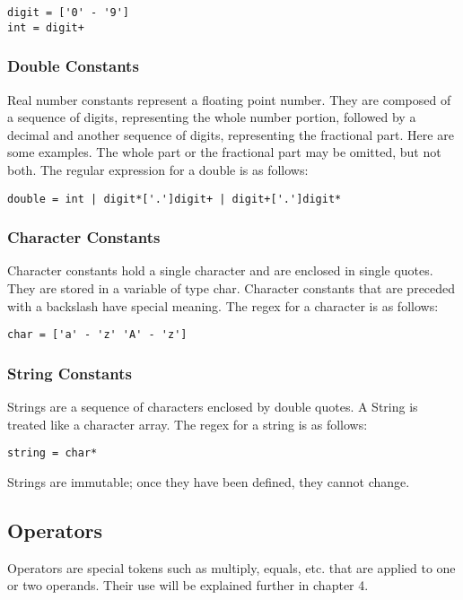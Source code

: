 \documentclass{article}
\begin{document}
\begin{Verbatim}[frame=single]
digit = ['0' - '9']
int = digit+
\end{Verbatim}

\subsubsection{Double Constants}
Real number constants represent a floating point number. They are composed of a sequence of digits, representing the whole number portion, followed by a decimal and another sequence of digits, representing the fractional part. Here are some examples. The whole part or the fractional part may be omitted, but not both.  The regular expression for a double is as follows:

\begin{Verbatim}[frame=single]
double = int | digit*['.']digit+ | digit+['.']digit*
\end{Verbatim}

\subsubsection{Character Constants}
Character constants hold a single character and are enclosed in single quotes. They are stored in a variable of type char. Character constants that are preceded with a backslash have special meaning. The regex for a character is as follows:

\begin{Verbatim}[frame=single]
char = ['a' - 'z' 'A' - 'z']
\end{Verbatim}

\subsubsection{String Constants}
Strings are a sequence of characters enclosed by double quotes. A String is treated like a character array. The regex for a string is as follows:

\begin{Verbatim}[frame=single]
string = char*
\end{Verbatim}
Strings are immutable; once they have been defined, they cannot change.

\subsection{Operators}
Operators are special tokens such as multiply, equals, etc. that are applied to one or two operands.  Their use will be explained further in chapter 4.
\end{document}
